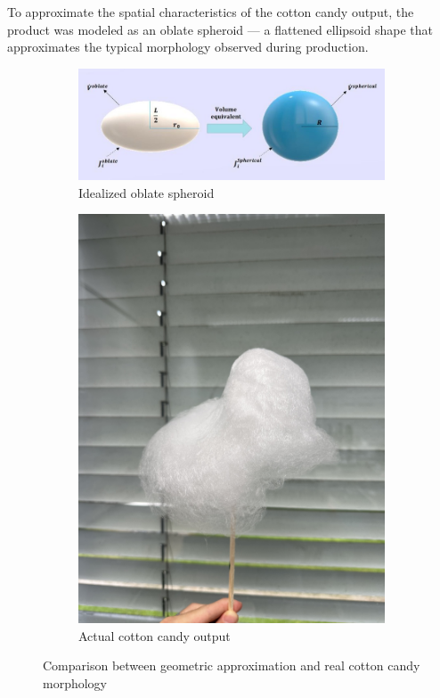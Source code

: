 To approximate the spatial characteristics of the cotton candy output, the product was modeled as an oblate spheroid — a flattened ellipsoid shape that approximates the typical morphology observed during production.

\begin{figure}[H]
    \centering
    \begin{subfigure}[b]{0.45\textwidth}
        \centering
        \includegraphics[width=\textwidth]{figures/Schematic-diagram-of-the-oblate-spheroid-and-its-volume-equivalent-sphere.jpg}
        \caption{Idealized oblate spheroid}
        \label{fig:oblate-spheroid}
    \end{subfigure}
    \hfill
    \begin{subfigure}[b]{0.45\textwidth}
        \centering
        \includegraphics[width=\textwidth]{figures/firstCC.jpeg}
        \caption{Actual cotton candy output}
        \label{fig:cotton-candy}
    \end{subfigure}
    \caption{Comparison between geometric approximation and real cotton candy morphology}
    \label{fig:volume-comparison}
\end{figure}

